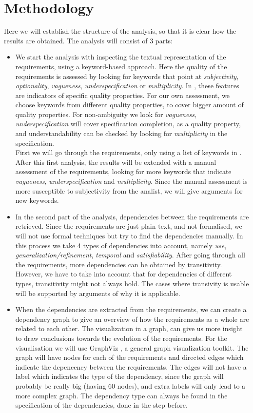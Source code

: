 \documentclass[a4paper,11pt]{article}
\begin{document}
	\section{Methodology}
		Here we will establish the structure of the analysis, so that it is clear how the results are obtained. The analysis will consist of 3 parts:
		\begin{itemize}
			\item We start the analysis with inspecting the textual representation of the requirements, using a keyword-based approach. Here the quality of the requirements is assessed by looking for keywords that point at \textit{subjectivity}, \textit{optionality}, \textit{vagueness}, \textit{underspecification} or \textit{multiplicity}. In \cite{keywords}, these features are indicators of specific quality properties. For our own assessment, we choose keywords from different quality properties, to cover bigger amount of quality properties. For non-ambiguity we look for \textit{vagueness}, \textit{underspecification} will cover specification completion, as a quality property, and understandability can be checked by looking for \textit{multiplicity} in the specification. \\
			First we will go through the requirements, only using a list of keywords in \cite{keywords}. After this first analysis, the results will be extended with a manual assessment of the requirements, looking for more keywords that indicate \textit{vagueness}, \textit{underspecification} and \textit{multiplicity}. Since the manual assessment is more susceptible to subjectivity from the analist, we will give arguments for new keywords.
			\item In the second part of the analysis, dependencies between the requirements are retrieved. Since the requirements are just plain text, and not formalised, we will not use formal techniques but try to find the dependencies manually. In this process we take 4 types of dependencies into account, namely \textit{use}, \textit{generalization/refinement}, \textit{temporal} and \textit{satisfiability}. After going through all the requirements, more dependencies can be obtained by transitivity. However, we have to take into account that for dependencies of different types, transitivity might not always hold. The cases where transivity is usable will be supported by arguments of why it is applicable.
			\item When the dependencies are extracted from the requirements, we can create a dependency graph to give an overview of how the requirements as a whole are related to each other. The visualization in a graph, can give us more insight to draw conclusions towards the evolution of the requirements. For the visualisation we will use GraphViz \cite{graphviz}, a general graph visualization toolkit. The graph will have nodes for each of the requirements and directed edges which indicate the depencency between the requirements. The edges will not have a label which indicates the type of the dependency, since the graph will probably be really big (having 60 nodes), and extra labels will only lead to a more complex graph. The dependency type can always be found in the specification of the dependencies, done in the step before.

\end{itemize}
\end{document}
